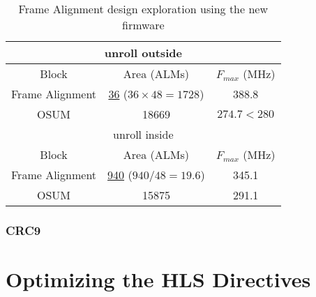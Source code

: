 \begin{table}[ht]
    \centering
    \begin{tabular}{|c|c|c|}
        \hline
        \hline
        \multicolumn{3}{|c|}{unroll outside} \\
        \hline
        Block & Area (ALMs) & \(F_{max}\) (MHz) \\
        \hline
        Frame Alignment & \underline{36} (\(36\times48=1728\)) & 388.8 \\
        OSUM & 18669 & \(274.7 < 280\) \\
        \hline
        \hline
        \multicolumn{3}{|c|}{unroll inside} \\
        \hline
        Block & Area (ALMs) & \(F_{max}\) (MHz) \\
        \hline
        Frame Alignment & \underline{940} (\(940/48=19.6\))& 345.1\\
        OSUM & 15875 & 291.1\\
        \hline
    \end{tabular}
    \caption{Frame Alignment design exploration using the new firmware}
    \label{tab:new-frame-alignment-optimization}
\end{table}

\subsubsection{CRC9}

\section{Optimizing the HLS Directives}
